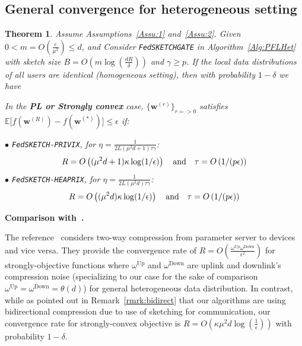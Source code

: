 \documentclass[twoside]{article}
\newtheorem{theorem}{Theorem}
\begin{document}
\subsection{General convergence for heterogeneous setting}\label{sec:gen-proof-hettt}

\begin{theorem}\label{appthm:hetreg_case}
Assume Assumptions~\ref{Assu:1} and~\ref{Assu:2}. Given $0<m=O\left(\frac{e}{\mu^2}\right)\leq d$, and Consider \texttt{FedSKETCHGATE} in Algorithm~\ref{Alg:PFLHet} with sketch size $B=O\left(m\log\left(\frac{d R}{\delta}\right)\right)$ and $\gamma\geq p$. 
If the local data distributions of all users are identical (homogeneous setting), then with probability $1-\delta$ we have  


 
In the \textbf{PL or Strongly convex} case, $\{ {\boldsymbol{w}}^{(r)}\}_{r=>0}$ satisfies $\mathbb{E}\Big[f({\boldsymbol{w}}^{(R)})-f({\boldsymbol{w}}^{(*)})\Big]\leq \epsilon$ if: 
 
\noindent $\bullet$ \texttt{FedSKETCH-PRIVIX}, for $\eta=\frac{1}{2L\left({\mu^2d}+1\right)\tau\gamma}$:    
\begin{equation}\notag
R=O\left((\mu^2d+1)\kappa \log(1/\epsilon)\right) \quad \textrm{and} \quad \tau=O\left(1/(p\epsilon)\right)
 \end{equation}
\noindent $\bullet$ \texttt{FedSKETCH-HEAPRIX}, for $\eta=\frac{1}{2L\left({\mu^2d}\right)\tau\gamma}$:
\begin{equation}\notag
R=O\left((\mu^2d)\kappa \log(1/\epsilon)\right) \quad \textrm{and} \quad \tau=O\left(1/(p\epsilon)\right)
 \end{equation}
 
 
 
 \end{theorem}


\textbf{Comparison with~\cite{philippenko2020artemis}.} 

The reference~\cite{philippenko2020artemis} considers two-way compression from parameter server to devices and vice versa. They provide the convergence rate of $R=O\left(\frac{\omega^{\text{Up}}\omega^{\text{Down}}}{\epsilon^2}\right)$ for strongly-objective functions where $\omega^{\text{Up}}$ and $\omega^{\text{Down}}$ are uplink and downlink's compression noise (specializing to our case for the sake of comparison $\omega^{\text{Up}}=\omega^{\text{Down}}=\theta\left(d\right)$) for general heterogeneous data distribution. In contrast, while as pointed out in Remark~\ref{rmrk:bidirect} that our algorithms are using bidirectional compression due to use of sketching for communication, our convergence rate for strongly-convex objective is $R=O(\kappa\mu^2d\log\left(\frac{1}{\epsilon}\right))$ with probability $1-\delta$.  
\end{document}
